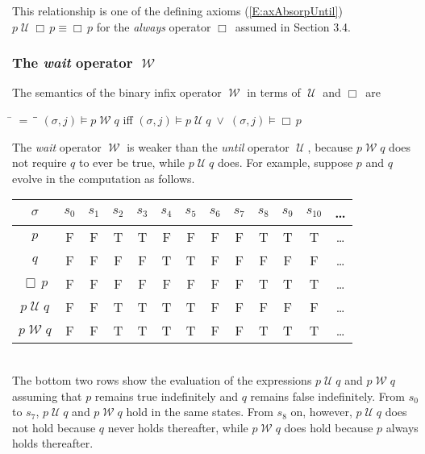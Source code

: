 \documentclass[fleqn, leqno]{article}
\newcommand{\mymathindent}{24pt}                    %
\newcommand{\Until}{\;\mathcal{U}\;}
\newcommand{\Wait}{\;\mathcal{W}\;}
\newcommand{\Always}{\Box\,}
\newcommand{\myqedtab}{\hspace{388.5pt}}              %
\begin{document}
This relationship is one of the defining axioms (\ref{E:axAbsorpUntil}) $p\Until \Always p \equiv \Always p$ for the \textit{always} operator $\Always$
assumed in Section 3.4. 

\subsubsection*{The \textit{wait} operator $\Wait$}

The semantics of the binary infix operator $\Wait$ in terms of $\Until$ and $\Always$ are

\begin{tabbing}
\hspace{\mymathindent} \= $= \;$ \= \myqedtab \= \kill
  \> $(\sigma, j) \models p \Wait q$ \quad iff \quad $(\sigma, j) \models p \Until q \; \lor \; (\sigma, j) \models \Always p$
\end{tabbing}

The \textit{wait} operator $\Wait$ is weaker than the \textit{until} operator $\Until$, because $p\Wait q$ does not require $q$ to ever be true,
while $p\Until q$ does.
For example, suppose $p$ and $q$ evolve in the computation as follows.\\

\begin{tabular}{c|cccccccccccc}
  $\sigma$       & $s_0$ & $s_1$ & $s_2$ & $s_3$ & $s_4$ & $s_5$ & $s_6$ & $s_7$ & $s_8$& $s_9$  & $s_{10}$&  \dots \\
  \hline
  $p$            & F     & F     & T     & T     & F     & F     & F     & F     & T     & T     & T     &  \dots\\
  $q$            & F     & F     & F     & F     & T     & T     & F     & F     & F     & F     & F     &  \dots\\
  $\Always p$    & F     & F     & F     & F     & F     & F     & F     & F     & T     & T     & T     &  \dots\\
  $p\Until q$    & F     & F     & T     & T     & T     & T     & F     & F     & F     & F     & F     &  \dots\\
  $p\Wait q$     & F     & F     & T     & T     & T     & T     & F     & F     & T     & T     & T     &  \dots\\
\end{tabular}\\

The bottom two rows show the evaluation of the expressions $p\Until q$ and $p\Wait q$
assuming that $p$ remains true indefinitely and $q$ remains false indefinitely.
From $s_0$ to $s_7$, $p\Until q$ and $p\Wait q$ hold in the same states.
From $s_8$ on, however, $p\Until q$ does not hold because $q$ never holds thereafter,
while $p\Wait q$ does hold because $p$ always holds thereafter.
\end{document}
